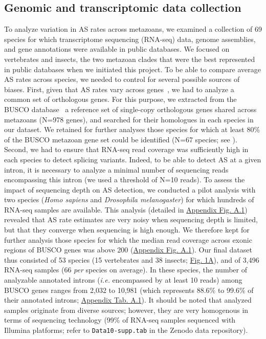 \subsection{Genomic and transcriptomic data collection}\label{sec:sampling_species}
To analyze variation in \acrshort{AS} rates across metazoans, we examined a collection of 69 species for which transcriptome sequencing (RNA-seq) data, genome assemblies, and gene annotations were available in public databases. We focused on vertebrates and insects, the two metazoan clades that were the best represented in public databases when we initiated this project. To be able to compare average \acrshort{AS} rates across species, we needed to control for several possible sources of biases. First, given that \acrshort{AS} rates vary across genes~\citep{saudemont_fitness_2017}, we had to analyze a common set of orthologous genes. For this purpose, we extracted from the \acrshort{BUSCO} database~\citep{seppey_busco_2019} a reference set of single-copy orthologous genes shared across metazoans (N=978 genes), and searched for their homologues in each species in our dataset. We retained for further analyses those species for which at least 80\% of the \acrshort{BUSCO} metazoan gene set could be identified (N=67 species; see ). Second, we had to ensure that RNA-seq read coverage was sufficiently high in each species to detect splicing variants. Indeed, to be able to detect \acrshort{AS} at a given intron, it is necessary to analyze a minimal number of sequencing reads encompassing this intron (we used a threshold of N=10 reads). To assess the impact of sequencing depth on \acrshort{AS} detection, we conducted a pilot analysis with two species (\textit{Homo sapiens} and \textit{Drosophila melanogaster}) for which hundreds of RNA-seq samples are available. This analysis (detailed in \hyperref[supp_fig:AS1]{Appendix Fig. A.1}) revealed that \acrshort{AS} rate estimates are very noisy when sequencing depth is limited, but that they converge when sequencing is high enough. We therefore kept for further analysis those species for which the median read coverage across exonic regions of \acrshort{BUSCO} genes was above 200 (\hyperref[supp_fig:AS1]{Appendix Fig. A.1}). Our final dataset thus consisted of 53 species (15 vertebrates and 38 insects; \hyperref[fig:AS1]{Fig. 1A}), and of 3,496 RNA-seq samples (66 \textit{per} species on average). In these species, the number of analyzable annotated introns (\textit{i.e.} encompassed by at least 10 reads) among \acrshort{BUSCO} genes ranges from 2,032 to 10,981 (which represents 88.6\% to 99.6\% of their annotated introns; \hyperref[table:1]{Appendix Tab. A.1}). It should be noted that analyzed samples originate from diverse sources; however, they are very homogenous in terms of sequencing technology (99\% of RNA-seq samples sequenced with Illumina platforms; refer to \verb|Data10-supp.tab| in the Zenodo data repository).


